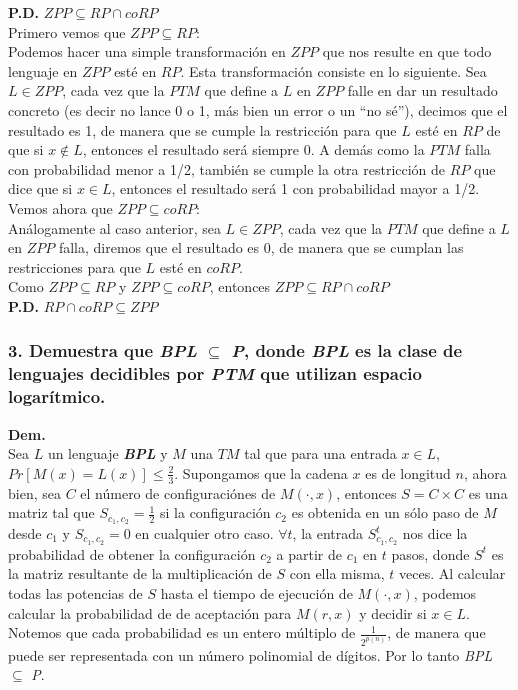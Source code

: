 \documentclass[12pt]{article}
\begin{document}
\fbox{\textbf{$\subseteq$}} \textbf{P.D.} $ZPP \subseteq RP \cap coRP$ \\

Primero vemos que $ZPP \subseteq RP$: \\
Podemos hacer una simple transformación en $ZPP$ que nos resulte en que todo lenguaje en $ZPP$ esté en $RP$. Esta transformación consiste en lo siguiente. Sea $L \in ZPP$, cada vez que la $PTM$ que define a $L$ en $ZPP$ falle en dar un resultado concreto (es decir no lance 0 o 1, más bien un error o un ``no sé''), decimos que el resultado es 1, de manera que se cumple la restricción para que $L$ esté en $RP$ de que si $x \notin L$, entonces el resultado será siempre 0. A demás como la $PTM$ falla con probabilidad menor a 1/2, también se cumple la otra restricción de $RP$ que dice que si $x \in L$, entonces el resultado será 1 con probabilidad mayor a 1/2. \\

Vemos ahora que $ZPP \subseteq coRP$: \\
Análogamente al caso anterior, sea $L \in ZPP$, cada vez que la $PTM$ que define a $L$ en $ZPP$ falla, diremos que el resultado es 0, de manera que se cumplan las restricciones para que $L$ esté en $coRP$. \\

Como $ZPP \subseteq RP$ y $ZPP \subseteq coRP$, entonces $ZPP \subseteq RP \cap coRP$ \\

\fbox{\textbf{$\supseteq$}} \textbf{P.D.} $RP \cap coRP \subseteq ZPP$ \\

\subsubsection*{3. Demuestra que \textit{BPL} $\subseteq$ \textit{P}, donde \textit{BPL} es la clase de lenguajes decidibles por \textit{PTM} que utilizan espacio logarítmico.}
\textbf{Dem.}\\
Sea $L$ un lenguaje \textbf{\textit{BPL}} y $M$ una $TM$ tal que para una entrada $x \in L$, $Pr[M(x) = L(x)] \leq \frac{2}{3}$. Supongamos que la cadena $x$ es de longitud $n$, ahora bien, sea $C$ el número de configuraciónes de $M(\cdot,x)$, entonces $S = C \times C$ es una matriz tal que $S_{{c_1},{c_2}} = \frac{1}{2}$ si la configuración $c_2$ es obtenida en un sólo paso de $M$ desde $c_1$ y  $S_{{c_1},{c_2}} = 0$ en cualquier otro caso. $\forall t$, la entrada $S^t_{{c_1},{c_2}}$ nos dice la probabilidad de obtener
la configuración $c_2$ a partir de $c_1$ en $t$ pasos, donde $S^t$ es la matriz resultante de la multiplicación de $S$ con ella misma, $t$ veces. Al calcular todas las potencias de $S$ hasta el tiempo de ejecución de $M(\cdot,x)$, podemos calcular la probabilidad de de aceptación para $M(r,x)$ y decidir si $x \in L$. Notemos que cada probabilidad es un entero múltiplo de $\frac{1}{2^{p(n)}}$, de manera que puede ser representada con un número polinomial de dígitos. Por lo tanto \textit{BPL} $\subseteq$ \textit{P}.
\end{document}

